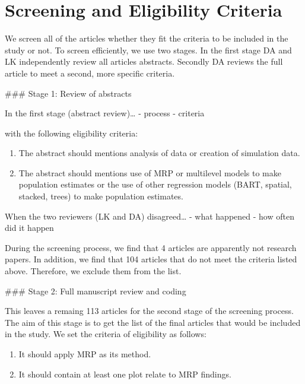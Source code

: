 \documentclass{monashthesis}
\begin{document}
\hypertarget{screening-and-eligibility-criteria}{%
\section{Screening and Eligibility Criteria}\label{screening-and-eligibility-criteria}}

We screen all of the articles whether they fit the criteria to be included in the study or not. To screen efficiently, we use two stages. In the first stage DA and LK independently review all articles abstracts. Secondly DA reviews the full article to meet a second, more specific criteria.

\#\#\# Stage 1: Review of abstracts

In the first stage (abstract review)\ldots{}
- process
- criteria

with the following eligibility criteria:

\begin{enumerate}
\def\labelenumi{\arabic{enumi}.}
\tightlist
\item
  The abstract should mentions analysis of data or creation of simulation data.
\item
  The abstract should mentions use of MRP or multilevel models to make population estimates or the use of other regression models (BART, spatial, stacked, trees) to make population estimates.
\end{enumerate}

When the two reviewers (LK and DA) disagreed\ldots{}
- what happened
- how often did it happen

During the screening process, we find that 4 articles are apparently not research papers. In addition, we find that 104 articles that do not meet the criteria listed above. Therefore, we exclude them from the list.

\#\#\# Stage 2: Full manuscript review and coding

This leaves a remaing 113 articles for the second stage of the screening process. The aim of this stage is to get the list of the final articles that would be included in the study. We set the criteria of eligibility as follows:

\begin{enumerate}
\def\labelenumi{\arabic{enumi}.}
\tightlist
\item
  It should apply MRP as its method.
\item
  It should contain at least one plot relate to MRP findings.
\end{enumerate}
\end{document}
